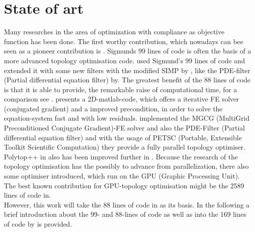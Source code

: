 \chapter{State of art}
Many researches
in the area of optimization with compliance
as objective function has been done. 
 The first worthy contribution, which nowadays can bee seen as a pioneer contribution is \cite{Sigmund.2001}. Sigmunds 99 lines of code is often the basis of a more advanced topology optimisation code.\cite{Andreassen.2011} used Sigmund's 99 lines of code and extended it with some new filters with the modified SIMP by \cite{Sigmund.2007}, like the PDE-filter (Partial differential equation filter) by\cite{Lazarov.2011}. The greatest benefit of the 88 lines of code is that it is able to provide, the remarkable raise of computational time, for a
 comparison see \cite{Andreassen.2011}. \cite{Amir.2014} presents a 2D-matlab-code, which offers a iterative FE solver (conjugated gradient) and a improved  precondition, in order to solve the equation-system fast and 
 with low residuals. \cite{Duarte.2015} implemented 
 the MGCG (MultiGrid Preconditioned Conjugate Gradient)-FE solver 
 and also the\cite{Lazarov.2011} PDE-Filter (Partial differential equation filter) and with the usage of PETSC (Portable, Extensible Toolkit Scientific Computation) they provide a fully parallel topology optimiser. Polytop++ in 
 \cite{Duarte.2015} also has been improved further in \cite{Aage.2015}. Because the research of the topology optimisation has the possibly to advance from parallelization, there also some optimiser introduced, which run on the GPU (Graphic Processing Unit). The best known
 contribution for GPU-topology optimisation might be the 2589 lines
 of code in\cite{Schmidt.2011}.\\

However, this work will take the 88 lines of code in \cite{Andreassen.2011} as its basis. In the following a brief introduction about the 99- and 88-lines of code as well as into the 169 lines of code by \cite{Liu.2014} is provided.

